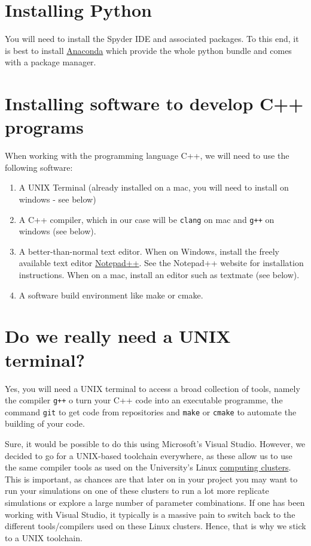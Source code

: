 \documentclass[
]{book}
\providecommand{\tightlist}{%
  \setlength{\itemsep}{0pt}\setlength{\parskip}{0pt}}
\begin{document}
\hypertarget{installing-python}{%
\section{Installing Python}\label{installing-python}}

You will need to install the Spyder IDE and associated packages. To this end, it is best to install \href{https://www.anaconda.com/products/individual}{Anaconda} which provide the whole python bundle and comes with a package manager.

\hypertarget{section:installcpp}{%
\section{Installing software to develop C++ programs}\label{section:installcpp}}

When working with the programming language C++, we will need to use the following software:

\begin{enumerate}
\def\labelenumi{\arabic{enumi}.}
\tightlist
\item
  A UNIX Terminal (already installed on a mac, you will need to install on windows - see below)
\item
  A C++ compiler, which in our case will be \texttt{clang} on mac and \texttt{g++} on windows (see below).
\item
  A better-than-normal text editor. When on Windows, install the freely available text editor \href{}{Notepad++}. See the Notepad++ website for installation instructions. When on a mac, install an editor such as textmate (see below).
\item
  A software build environment like make or cmake.
\end{enumerate}

\hypertarget{do-we-really-need-a-unix-terminal}{%
\section{Do we really need a UNIX terminal?}\label{do-we-really-need-a-unix-terminal}}

Yes, you will need a UNIX terminal to access a broad collection of tools, namely the compiler \texttt{g++} o turn your C++ code into an executable programme, the command \texttt{git} to get code from repositories and \texttt{make} or \texttt{cmake} to automate the building of your code.

Sure, it would be possible to do this using Microsoft's Visual Studio. However, we decided to go for a UNIX-based toolchain everywhere, as these allow us to use the same compiler tools as used on the University's Linux \href{https://universityofexeteruk.sharepoint.com/sites/CornwallARC}{computing clusters}. This is important, as chances are that later on in your project you may want to run your simulations on one of these clusters to run a lot more replicate simulations or explore a large number of parameter combinations. If one has been working with Visual Studio, it typically is a massive pain to switch back to the different tools/compilers used on these Linux clusters. Hence, that is why we stick to a UNIX toolchain.
\end{document}
